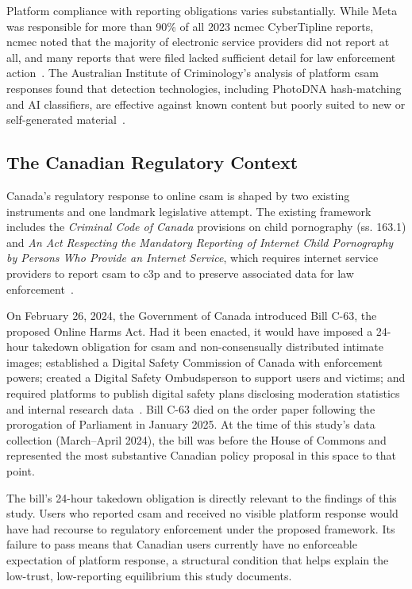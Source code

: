 \documentclass{ieee-portfolio}
\begin{document}
Platform compliance with reporting obligations varies substantially. While Meta was responsible for more than 90\% of all 2023 \gls{ncmec} CyberTipline reports, \gls{ncmec} noted that the majority of electronic service providers did not report at all, and many reports that were filed lacked sufficient detail for law enforcement action~\cite{ncmec_2023}. The Australian Institute of Criminology's analysis of platform \gls{csam} responses found that detection technologies, including PhotoDNA hash-matching and AI classifiers, are effective against known content but poorly suited to new or self-generated material~\cite{aic_2022}.
 
\subsection{The Canadian Regulatory Context}
 
Canada's regulatory response to online \gls{csam} is shaped by two existing instruments and one landmark legislative attempt. The existing framework includes the \textit{Criminal Code of Canada} provisions on child pornography (ss. 163.1) and \textit{An Act Respecting the Mandatory Reporting of Internet Child Pornography by Persons Who Provide an Internet Service}, which requires internet service providers to report \gls{csam} to \gls{c3p} and to preserve associated data for law enforcement~\cite{gc_c63_2024}.
 
On February 26, 2024, the Government of Canada introduced Bill C-63, the proposed Online Harms Act. Had it been enacted, it would have imposed a 24-hour takedown obligation for \gls{csam} and non-consensually distributed intimate images; established a Digital Safety Commission of Canada with enforcement powers; created a Digital Safety Ombudsperson to support users and victims; and required platforms to publish digital safety plans disclosing moderation statistics and internal research data~\cite{gc_c63_2024}. Bill C-63 died on the order paper following the prorogation of Parliament in January 2025. At the time of this study's data collection (March--April 2024), the bill was before the House of Commons and represented the most substantive Canadian policy proposal in this space to that point.
 
The bill's 24-hour takedown obligation is directly relevant to the findings of this study. Users who reported \gls{csam} and received no visible platform response would have had recourse to regulatory enforcement under the proposed framework. Its failure to pass means that Canadian users currently have no enforceable expectation of platform response, a structural condition that helps explain the low-trust, low-reporting equilibrium this study documents.
 
\end{document}
